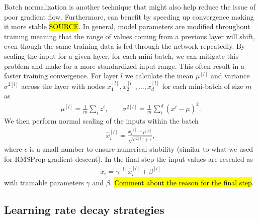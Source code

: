 Batch normalization is another technique that might also help reduce the issue of poor gradient flow. Furthermore, can benefit by speeding up convergence making it more stable \hl{SOURCE}. In general, model parameters are modified throughout training meaning that the range of values coming from a previous layer will shift, even though the same training data is fed through the network repeatedly.  By scaling the input for a given layer, for each mini-batch, we can mitigate this problem and make for a more standardized input range. This often result in a faster training convergence. For layer $l$ we calculate the mean $\mu^{[l]}$ and variance $\sigma^{2[l]}$ across the layer with nodes $x_1^{[l]}, x_2^{[l]}, \ldots, x_d^{[l]}$ for each mini-batch of size $m$ as
\begin{align*}
  \mu^{[l]} = \frac{1}{m} \sum_i z^i, \qquad \sigma^{2[l]} = \frac{1}{m} \sum_i^d (x^i-\mu)^2.
\end{align*}
We then perform normal scaling of the inputs within the batch
\begin{align*}
  \hat{x}_i^{[l]} = \frac{x_i^{[l]} - \mu^{[l]}}{\sqrt{\sigma^{2[l]} + \epsilon}},
\end{align*}
where $\epsilon$ is a small number to ensure numerical stability (similar to what we used for RMSProp gradient descent). In the final step the input values are rescaled as
\begin{align*}
  \tilde{x_i} = \gamma^{[l]} \hat{x}_i^{[l]} + \beta^{[l]}
\end{align*}
with trainable parameters $\gamma$ and $\beta$. \hl{Comment about the reason for the final step}.





\subsection{Learning rate decay strategies}

